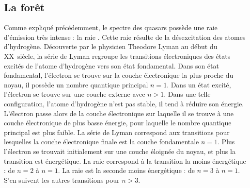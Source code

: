 \documentclass[11pt, twoside, a4paper, openright]{report}
\begin{document}
\subsection{La forêt \lya{}}
\label{subsec:lya}
Comme expliqué précédemment, le spectre des quasars possède une raie d'émission très intense : la raie \lya{}. Cette raie résulte de la désexcitation des atomes d'hydrogène. Découverte par le physicien Theodore Lyman au début du \textsc{XX}\ieme~siècle, la série de Lyman regroupe les transitions électroniques des états excités de l'atome d'hydrogène vers son état fondamental. Dans son état fondamental, l'électron se trouve sur la couche électronique la plus proche du noyau, il possède un nombre quantique principal $n=1$. Dans un état excité, l'électron se trouve sur une couche externe avec $n > 1$. Dans une telle configuration, l'atome d'hydrogène n'est pas stable, il tend à réduire son énergie. L'électron passe alors de la couche électronique sur laquelle il se trouve à une couche électronique de plus basse énergie, pour laquelle le nombre quantique principal est plus faible. La série de Lyman correspond aux transitions pour lesquelles la couche électronique finale est la couche fondamentale $n=1$. Plus l'électron se trouvait initialement sur une couche éloignée du noyau, et plus la transition est énergétique. La raie \lya{} correspond à la transition la moins énergétique : de $n=2$ à $n=1$. La raie \lyb{} est la seconde moins énergétique : de $n=3$ à $n=1$. S'en suivent les autres transitions pour $n > 3$.
\end{document}
